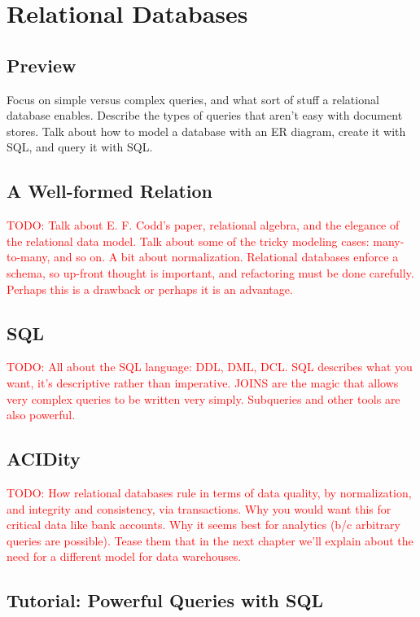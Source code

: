 \documentclass[11pt]{book}
\newcommand{\todo}[1]{\textcolor{red}{TODO: #1}} %
\begin{document}
\chapter{Relational Databases}\label{ch:sql}

\section*{Preview}

Focus on simple versus complex queries, and what sort of stuff a relational database enables.  Describe the types of queries that aren't easy with document stores.  Talk about how to model a database with an ER diagram, create it with SQL, and query it with SQL.

\section{A Well-formed Relation}
\todo{Talk about E. F. Codd's paper, relational algebra, and the elegance of the relational data model.  Talk about some of the tricky modeling cases: many-to-many, and so on.  A bit about normalization.  Relational databases enforce a schema, so up-front thought is important, and refactoring must be done carefully.  Perhaps this is a drawback or perhaps it is an advantage.}

\section{SQL}
\todo{All about the SQL language: DDL, DML, DCL.  SQL describes what you want, it's descriptive rather than imperative.  JOINS are the magic that allows very complex queries to be written very simply.  Subqueries and other tools are also powerful.}

\section{ACIDity}
\todo{How relational databases rule in terms of data quality, by normalization, and integrity and consistency, via transactions.  Why you would want this for critical data like bank accounts.  Why it seems best for analytics (b/c arbitrary queries are possible).  Tease them that in the next chapter we'll explain about the need for a different model for data warehouses.}

\section*{Tutorial: Powerful Queries with SQL}
\end{document}
